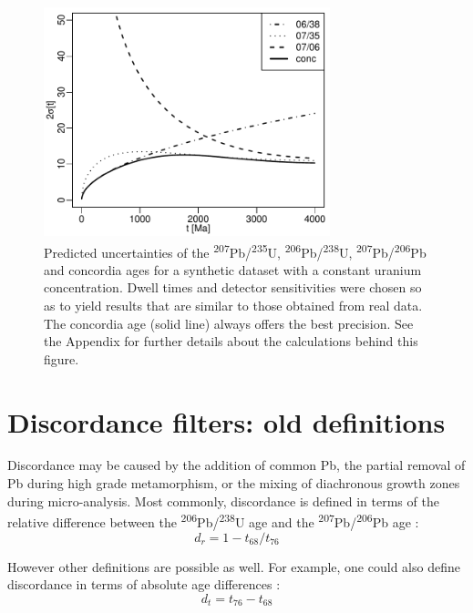\documentclass[gchron, manuscript]{copernicus}
\begin{document}
\begin{figure}[t]
  \includegraphics[width=8.3cm]{agerr.pdf}
  \caption{Predicted uncertainties of the
    \textsuperscript{207}Pb/\textsuperscript{235}U,
    \textsuperscript{206}Pb/\textsuperscript{238}U,
    \textsuperscript{207}Pb/\textsuperscript{206}Pb and concordia
    ages for a synthetic dataset with a constant uranium
    concentration. Dwell times and detector sensitivities were
    chosen so as to yield results that are similar to those obtained
    from real data. The concordia age (solid line) always offers the
    best precision. See the Appendix for further details about the
    calculations behind this figure.}
  \label{fig:precision}
\end{figure}

\section{Discordance filters: old definitions}\label{sec:discordance1}

Discordance may be caused by the addition of common Pb, the partial
removal of Pb during high grade metamorphism, or the mixing of
diachronous growth zones during micro-analysis. Most commonly,
discordance is defined in terms of the relative difference between the
\textsuperscript{206}Pb/\textsuperscript{238}U age and the
\textsuperscript{207}Pb/\textsuperscript{206}Pb age
\citep{gehrels2011}:
\begin{equation}
  d_r = 1 - t_{68}/t_{76}
  \label{eq:dr}
\end{equation}

However other definitions are possible as well. For example, one could
also define discordance in terms of absolute age differences
\citep{puetz2018}:
\begin{equation}
  d_t = t_{76} - t_{68}
  \label{eq:dt}
\end{equation}
\end{document}
